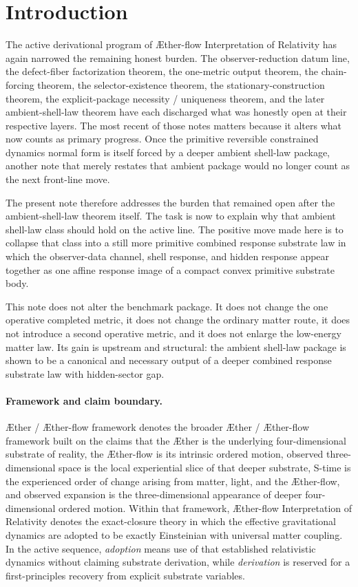 \documentclass[11pt]{article}
\newcommand{\Aether}{\AE{}ther}
\newcommand{\Aflow}{\AE{}ther-flow}
\newcommand{\TheoryName}{\Aflow{} Interpretation of Relativity}
\newcommand{\TheoryProgram}{\Aether{} / \Aflow{} framework}
\begin{document}
\section{Introduction}

The active derivational program of \TheoryName{} has again narrowed the remaining honest burden. The observer-reduction datum line, the defect-fiber factorization theorem, the one-metric output theorem, the chain-forcing theorem, the selector-existence theorem, the stationary-construction theorem, the explicit-package necessity / uniqueness theorem, and the later ambient-shell-law theorem have each discharged what was honestly open at their respective layers. The most recent of those notes matters because it alters what now counts as primary progress. Once the primitive reversible constrained dynamics normal form is itself forced by a deeper ambient shell-law package, another note that merely restates that ambient package would no longer count as the next front-line move.

The present note therefore addresses the burden that remained open after the ambient-shell-law theorem itself. The task is now to explain why that ambient shell-law class should hold on the active line. The positive move made here is to collapse that class into a still more primitive combined response substrate law in which the observer-data channel, shell response, and hidden response appear together as one affine response image of a compact convex primitive substrate body.

This note does not alter the benchmark package. It does not change the one operative completed metric, it does not change the ordinary matter route, it does not introduce a second operative metric, and it does not enlarge the low-energy matter law. Its gain is upstream and structural: the ambient shell-law package is shown to be a canonical and necessary output of a deeper combined response substrate law with hidden-sector gap.

\paragraph{Framework and claim boundary.}
\TheoryProgram{} denotes the broader \Aether{} / \Aflow{} framework built on the claims that the \Aether{} is the underlying four-dimensional substrate of reality, the \Aflow{} is its intrinsic ordered motion, observed three-dimensional space is the local experiential slice of that deeper substrate, S-time is the experienced order of change arising from matter, light, and the \Aflow{}, and observed expansion is the three-dimensional appearance of deeper four-dimensional ordered motion. Within that framework, \TheoryName{} denotes the exact-closure theory in which the effective gravitational dynamics are adopted to be exactly Einsteinian with universal matter coupling. In the active sequence, \emph{adoption} means use of that established relativistic dynamics without claiming substrate derivation, while \emph{derivation} is reserved for a first-principles recovery from explicit substrate variables.
\end{document}
